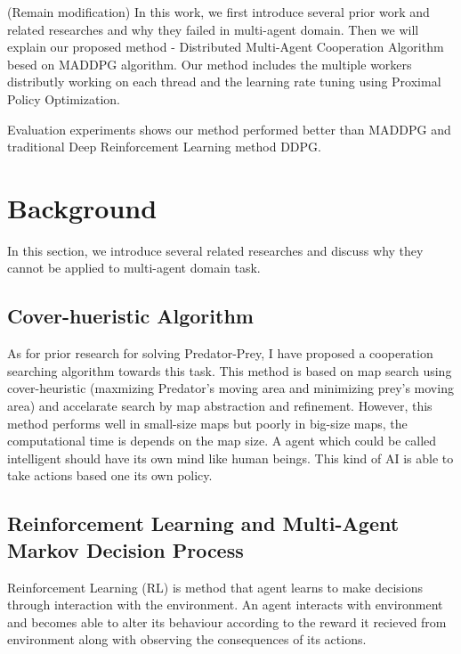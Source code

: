 \documentclass[11pt,twocolumn]{jarticle} %
\begin{document}
(Remain modification)
In this work, we first introduce several prior work and related researches and why they failed in multi-agent domain. Then we will explain our proposed method - Distributed Multi-Agent Cooperation Algorithm besed on MADDPG algorithm\cite{maddpg}. Our method includes the multiple workers distributly working on each thread and the learning rate tuning using Proximal Policy Optimization\cite{ppo}. \par

Evaluation experiments shows our method performed better than MADDPG and traditional Deep Reinforcement Learning method DDPG. \par

\section{Background} 
In this section, we introduce several related researches and discuss why they cannot be applied to multi-agent domain task.
\subsection{Cover-hueristic Algorithm}
As for prior research for solving Predator-Prey, I have proposed a cooperation searching algorithm\cite{cover} towards this task. This method is based on map search using cover-heuristic (maxmizing Predator's moving area and minimizing prey's moving area) and accelarate search by map abstraction and refinement. However, this method performs well in small-size maps but poorly in big-size maps, the computational time is depends on the map size. A agent which could be called intelligent should have its own mind like human beings. This kind of AI is able to take actions based one its own policy.\par


\subsection{Reinforcement Learning and Multi-Agent Markov Decision Process}

Reinforcement Learning (RL) is method that agent learns to make decisions through interaction with the environment. An agent interacts with environment and becomes able to alter its behaviour according to the reward it recieved from environment along with observing the consequences of its actions. \par
\end{document}
